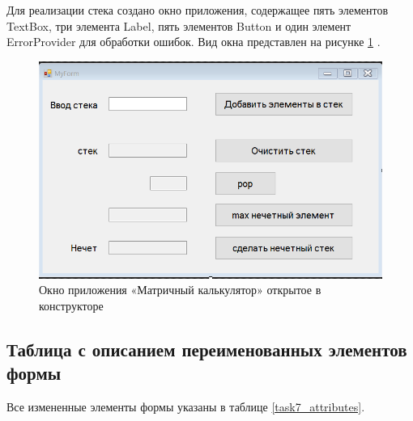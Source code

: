 Для реализации стека создано окно приложения, содержащее пять элементов TextBox, три элемента Label, пять элементов Button и один элемент ErrorProvider для обработки ошибок. Вид окна представлен на рисунке \ref{task7_form} \cite{chang2021analysis}.
\begin{figure}[H]
    \centering
    \includegraphics[width=1\linewidth]{lections/img/task7_form.png}
    \caption{Окно приложения «Матричный калькулятор» открытое в конструкторе}
    \label{task7_form}
\end{figure}



\subsection{Таблица с описанием переименованных элементов формы}
Все измененные элементы формы указаны в таблице \ref{task7_attributes}.


